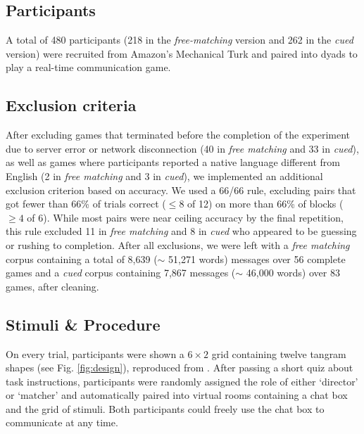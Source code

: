 \documentclass[alpha-refs]{wiley-article}
\begin{document}
\subsection{Participants}\label{participants}

A total of 480 participants (218 in the \emph{free-matching} version and 262 in the \emph{cued} version) were recruited from Amazon's Mechanical Turk and paired into dyads to play a real-time communication game.

\subsection{Exclusion criteria}

After excluding games that terminated before the completion of the experiment due to server error or network disconnection (40 in \emph{free matching} and 33 in \emph{cued}), as well as games where participants reported a native language different from English (2 in \emph{free matching} and 3 in \emph{cued}), we implemented an additional exclusion criterion based on accuracy.
We used a 66/66 rule, excluding pairs that got fewer than 66\% of trials correct ($\le8$ of 12)  on more than 66\% of blocks ($\ge4$ of 6).
While most pairs were near ceiling accuracy by the final repetition, this rule excluded 11 in \emph{free matching} and 8 in \emph{cued} who appeared to be guessing or rushing to completion.
After all exclusions, we were left with a \emph{free matching} corpus containing a total of 8,639 ($\sim$ 51,271 words) messages over 56 complete games and a \emph{cued} corpus containing 7,867 messages ($\sim$ 46,000 words) over 83 games, after cleaning.

\subsection{Stimuli \& Procedure}\label{stimuli}

On every trial, participants were shown a \(6 \times 2\) grid containing twelve tangram shapes (see Fig. \ref{fig:design}), reproduced from \cite{ClarkWilkesGibbs86_ReferringCollaborative}.
After passing a short quiz about task instructions, participants were randomly assigned the role of either `director' or `matcher' and automatically paired into virtual rooms containing a chat box and the grid of stimuli.
Both participants could freely use the chat box to communicate at any time.
\end{document}
